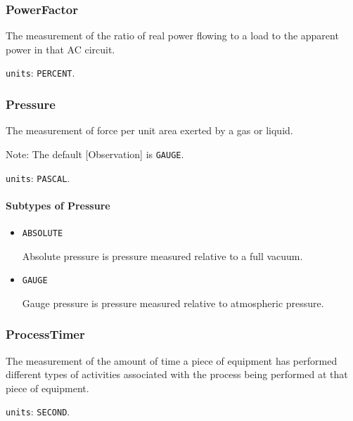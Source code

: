 \subsubsection{PowerFactor}
\label{sec:PowerFactor}



The measurement of the ratio of real power flowing to a load to the apparent power in that AC circuit.


\texttt{units}: \texttt{PERCENT}.


\subsubsection{Pressure}
\label{sec:Pressure}



The measurement of force per unit area exerted by a gas or liquid.

Note: The default [Observation] is \texttt{GAUGE}.


\texttt{units}: \texttt{PASCAL}.

\paragraph{Subtypes of Pressure}\mbox{}
\label{sec:Subtypes of Pressure}

\begin{itemize}

\item \texttt{ABSOLUTE}


Absolute pressure is pressure measured relative to a full vacuum.

\item \texttt{GAUGE}


Gauge pressure is pressure measured relative to atmospheric pressure.


\end{itemize}





\subsubsection{ProcessTimer}
\label{sec:ProcessTimer}



The measurement of the amount of time a piece of equipment has performed different types of activities associated with the process being performed at that piece of equipment.


\texttt{units}: \texttt{SECOND}.

